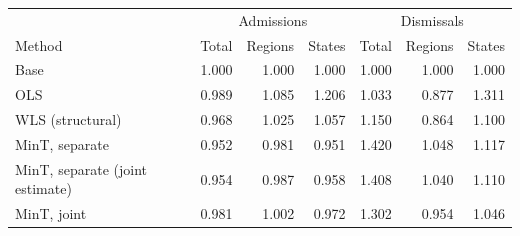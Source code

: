 \centering\small
\begin{tabular}{lrrrrrr}
\hline
 & \multicolumn{3}{c}{Admissions} & \multicolumn{3}{c}{Dismissals} \\
Method & Total & Regions & States & Total & Regions & States \\
\hline
Base & 1.000 & 1.000 & 1.000 & 1.000 & 1.000 & 1.000 \\
OLS & 0.989 & 1.085 & 1.206 & 1.033 & 0.877 & 1.311 \\
WLS (structural) & 0.968 & 1.025 & 1.057 & 1.150 & 0.864 & 1.100 \\
MinT, separate & 0.952 & 0.981 & 0.951 & 1.420 & 1.048 & 1.117 \\
MinT, separate (joint estimate) & 0.954 & 0.987 & 0.958 & 1.408 & 1.040 & 1.110 \\
MinT, joint & 0.981 & 1.002 & 0.972 & 1.302 & 0.954 & 1.046 \\
\hline
\end{tabular}
